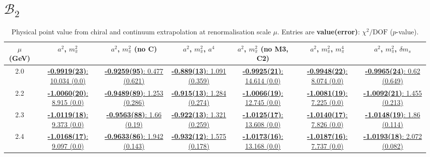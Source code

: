 \documentclass[12pt]{extarticle}
\begin{document}
\section{$\mathcal{B}_2$}
\begin{table}[h!]
\begin{center}
\begin{tabular}{|c|c|c|c|c|c|c|}
\hline
$\mu$ (GeV) & $a^2$, $m_\pi^2$& $a^2$, $m_\pi^2$ (no C)& $a^2$, $m_\pi^2$, $a^4$& $a^2$, $m_\pi^2$ (no M3, C2)& $a^2$, $m_\pi^2$, $m_\pi^4$& $a^2$, $m_\pi^2$, $\delta m_s$\\
\hline
2.0& \hyperlink{VVmAA/NPR/bag_a2m2_20.pdf.1}{\textbf{-0.9919(23)}: 10.034 (0.0)} & \hyperlink{VVmAA/NPR/bag_a2m2noC_20.pdf.1}{\textbf{-0.9259(95)}: 0.477 (0.621)} & \hyperlink{VVmAA/NPR/bag_a2a4m2_20.pdf.1}{\textbf{-0.889(13)}: 1.091 (0.359)} & \hyperlink{VVmAA/NPR/bag_a2m2mcut_20.pdf.1}{\textbf{-0.9925(21)}: 14.614 (0.0)} & \hyperlink{VVmAA/NPR/bag_a2m2m4_20.pdf.1}{\textbf{-0.9948(22)}: 8.074 (0.0)} & \hyperlink{VVmAA/NPR/bag_a2m2delm_20.pdf.1}{\textbf{-0.9965(24)}: 0.62 (0.649)}\\
2.2& \hyperlink{VVmAA/NPR/bag_a2m2_22.pdf.1}{\textbf{-1.0060(20)}: 8.915 (0.0)} & \hyperlink{VVmAA/NPR/bag_a2m2noC_22.pdf.1}{\textbf{-0.9489(89)}: 1.253 (0.286)} & \hyperlink{VVmAA/NPR/bag_a2a4m2_22.pdf.1}{\textbf{-0.915(13)}: 1.284 (0.274)} & \hyperlink{VVmAA/NPR/bag_a2m2mcut_22.pdf.1}{\textbf{-1.0066(19)}: 12.745 (0.0)} & \hyperlink{VVmAA/NPR/bag_a2m2m4_22.pdf.1}{\textbf{-1.0081(19)}: 7.225 (0.0)} & \hyperlink{VVmAA/NPR/bag_a2m2delm_22.pdf.1}{\textbf{-1.0092(21)}: 1.455 (0.213)}\\
2.3& \hyperlink{VVmAA/NPR/bag_a2m2_23.pdf.1}{\textbf{-1.0119(18)}: 9.373 (0.0)} & \hyperlink{VVmAA/NPR/bag_a2m2noC_23.pdf.1}{\textbf{-0.9563(88)}: 1.66 (0.19)} & \hyperlink{VVmAA/NPR/bag_a2a4m2_23.pdf.1}{\textbf{-0.922(13)}: 1.321 (0.259)} & \hyperlink{VVmAA/NPR/bag_a2m2mcut_23.pdf.1}{\textbf{-1.0125(17)}: 13.608 (0.0)} & \hyperlink{VVmAA/NPR/bag_a2m2m4_23.pdf.1}{\textbf{-1.0140(17)}: 7.826 (0.0)} & \hyperlink{VVmAA/NPR/bag_a2m2delm_23.pdf.1}{\textbf{-1.0148(19)}: 1.86 (0.114)}\\
2.4& \hyperlink{VVmAA/NPR/bag_a2m2_24.pdf.1}{\textbf{-1.0168(17)}: 9.097 (0.0)} & \hyperlink{VVmAA/NPR/bag_a2m2noC_24.pdf.1}{\textbf{-0.9633(86)}: 1.942 (0.143)} & \hyperlink{VVmAA/NPR/bag_a2a4m2_24.pdf.1}{\textbf{-0.932(12)}: 1.575 (0.178)} & \hyperlink{VVmAA/NPR/bag_a2m2mcut_24.pdf.1}{\textbf{-1.0173(16)}: 13.168 (0.0)} & \hyperlink{VVmAA/NPR/bag_a2m2m4_24.pdf.1}{\textbf{-1.0187(16)}: 7.737 (0.0)} & \hyperlink{VVmAA/NPR/bag_a2m2delm_24.pdf.1}{\textbf{-1.0193(18)}: 2.072 (0.082)}\\
\hline
\end{tabular}
\caption{Physical point value from chiral and continuum extrapolation at renormalisation scale $\mu$. Entries are \textbf{value(error)}: $\chi^2/\text{DOF}$ ($p$-value).}
\end{center}
\end{table}
\end{document}
